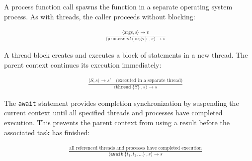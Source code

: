 A process function call spawns the function in a separate operating system process. As with threads, the caller proceeds without blocking:

\begin{align*}
[\text{ProcessCall}] \quad
& \frac{
  \langle \text{args}, s \rangle \rightarrow v
}{
  \langle \texttt{process}\ id(\text{args}) \ , s \rangle \rightarrow s
}
\end{align*}

A thread block creates and executes a block of statements in a new thread. The parent context continues its execution immediately:

\begin{align*}
[\text{ThreadBlock}] \quad
& \frac{
  \langle S, s \rangle \rightarrow s' \quad \text{(executed in a separate thread)}
}{
  \langle \texttt{thread}\ \{S\} \ , s \rangle \rightarrow s
}
\end{align*}

The \texttt{await} statement provides completion synchronization by suspending the current context until all specified threads and processes have completed execution. This prevents the parent context from using a result before the associated task has finished:

\begin{align*}
[\text{Await}] \quad
& \frac{
  \text{all referenced threads and processes have completed execution}
}{
  \langle \texttt{await}\ \{t_1, t_2, \dots \} \ , s \rangle \rightarrow s
}
\end{align*}